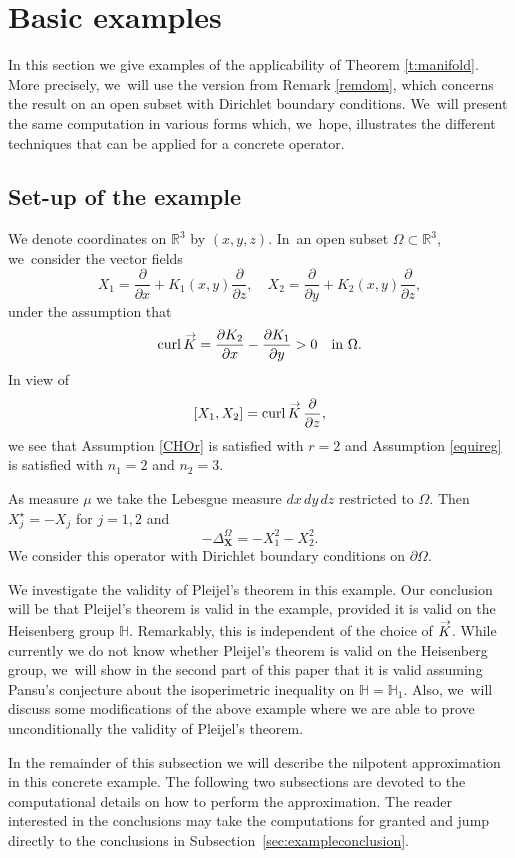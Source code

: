 \documentclass[JEP,XML,SOM,Unicode,published]{cedram}
\DeclareMathOperator{\curl}{curl}
\newcommand{\bX}{{\boldsymbol{X}}}
\renewcommand{\vec}[1]
{\overset{\,{\raisebox{-2pt}{$\scriptstyle\to$}}}{#1}}
\theoremstyle{definition}
\newcommand{\1}{\mathbbm{1}}
\newcommand{\R}{\mathbb{R}}
\begin{document}
\section{Basic examples}\label{AppA}

In this section we give examples of the applicability of Theorem \ref{t:manifold}. More precisely, we~will use the version from Remark \ref{remdom}, which concerns the result on an open subset with Dirichlet boundary conditions. We~will present the same computation in various forms which, we~hope, illustrates the different techniques that can be applied for a concrete operator.

\subsection{Set-up of the example}
We denote coordinates on $\R^3$ by $(x,y,z)$. In~an open subset $\Omega\subset\R^3$, we~consider the vector fields
\[
X_1= \frac{\partial}{\partial x} + K_1(x,y) \frac{\partial}{\partial z},
\quad
X_2= \frac{\partial}{\partial y} + K_2 (x,y) \frac{\partial}{\partial z},
\]
under the assumption that
\[
\curl \vec K = \frac{\partial K_2}{\partial x} - \frac{\partial K_1}{\partial y} >0
\quad\text{in}\ \Omega.
\]
In view of
\[
[X_1,X_2] = \curl \vec K \,\frac{\partial}{\partial z},
\]
we see that Assumption \ref{CHOr} is satisfied with $r=2$ and Assumption \ref{equireg} is satisfied with $n_1=2$ and $n_2=3$.

As measure $\mu$ we take the Lebesgue measure $dx\,dy\,dz$ restricted to $\Omega$. Then $X_j^\star = - X_j$ for $j=1,2$ and
\[
-\Delta_\bX^\Omega = - X_1^2- X_2^2.
\]
We consider this operator with Dirichlet boundary conditions on $\partial\Omega$.

We investigate the validity of Pleijel's theorem in this example. Our conclusion will be that Pleijel's theorem is valid in the example, provided it is valid on the Heisenberg group $\mathbb H$. Remarkably, this is independent of the choice of $\vec K$. While currently we do not know whether Pleijel's theorem is valid on the Heisenberg group, we~will show in the second part of this paper that it is valid assuming Pansu's conjecture about the isoperimetric inequality on $\mathbb H=\mathbb H_1$. Also, we~will discuss some modifications of the above example where we are able to prove unconditionally the validity of Pleijel's theorem.

In the remainder of this subsection we will describe the nilpotent approximation in this concrete example. The following two subsections are devoted to the computational details on how to perform the approximation. The reader interested in the conclusions may take the computations for granted and jump directly to the conclusions in Subsection~\ref{sec:exampleconclusion}.
\end{document}

